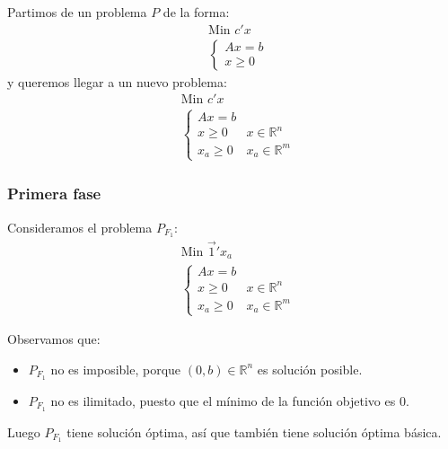 Partimos de un problema $P$ de la forma:
\begin{align*}
     & \text{Min } c'x \\
     & \begin{cases}
           Ax = b \\
           x \geq 0
       \end{cases}
\end{align*}
y queremos llegar a un nuevo problema:
\begin{align*}
     & \text{Min } c'x                   \\
     & \begin{cases}
           Ax = b                            \\
           x \geq 0   & x \in \mathbb{R}^n   \\
           x_a \geq 0 & x_a \in \mathbb{R}^m
       \end{cases}
\end{align*}

\subsubsection*{Primera fase}
Consideramos el problema $P_{F_1}$:
\begin{align*}
     & \text{Min } \vec{1}' x_a          \\
     & \begin{cases}
           Ax = b                            \\
           x \geq 0   & x \in \mathbb{R}^n   \\
           x_a \geq 0 & x_a \in \mathbb{R}^m
       \end{cases}
\end{align*}

Observamos que:
\begin{itemize}
    \item $P_{F_1}$ no es imposible, porque $(0, b) \in \mathbb{R}^n$ es solución posible.
    \item $P_{F_1}$ no es ilimitado, puesto que el mínimo de la función objetivo es 0.
\end{itemize}
Luego $P_{F_1}$ tiene solución óptima, así que también tiene solución óptima básica.

